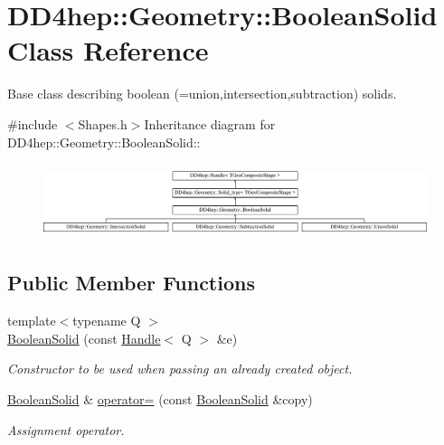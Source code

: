 \hypertarget{class_d_d4hep_1_1_geometry_1_1_boolean_solid}{
\section{DD4hep::Geometry::BooleanSolid Class Reference}
\label{class_d_d4hep_1_1_geometry_1_1_boolean_solid}
}


Base class describing boolean (=union,intersection,subtraction) solids.  


{\ttfamily \#include $<$Shapes.h$>$}Inheritance diagram for DD4hep::Geometry::BooleanSolid::\begin{figure}[H]
\begin{center}
\leavevmode
\includegraphics[height=2.20256cm]{class_d_d4hep_1_1_geometry_1_1_boolean_solid}
\end{center}
\end{figure}
\subsection*{Public Member Functions}
\begin{DoxyCompactItemize}
\item 
{\footnotesize template$<$typename Q $>$ }\\\hyperlink{class_d_d4hep_1_1_geometry_1_1_boolean_solid_a2808abd6768240d7b58e6de60effee0a}{BooleanSolid} (const \hyperlink{class_d_d4hep_1_1_handle}{Handle}$<$ Q $>$ \&e)
\begin{DoxyCompactList}\small\item\em Constructor to be used when passing an already created object. \item\end{DoxyCompactList}\item 
\hyperlink{class_d_d4hep_1_1_geometry_1_1_boolean_solid}{BooleanSolid} \& \hyperlink{class_d_d4hep_1_1_geometry_1_1_boolean_solid_a454e550eb5ec2c515b1c38bc8dc54914}{operator=} (const \hyperlink{class_d_d4hep_1_1_geometry_1_1_boolean_solid}{BooleanSolid} \&copy)
\begin{DoxyCompactList}\small\item\em Assignment operator. \item\end{DoxyCompactList}\end{DoxyCompactItemize}

